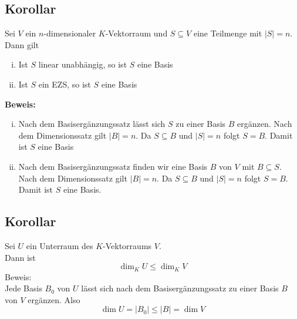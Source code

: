\subsection{Korollar} %
\label{sub:korollar}
Sei $V$ ein $n$-dimensionaler $K$-Vektorraum und $S \subseteq V$ eine Teilmenge mit $|S| =n$. Dann gilt
\begin{enumerate}[(i)]
	\item Ist $S$ linear unabhängig, so ist $S$ eine Basis
	\item Ist $S$ ein EZS, so ist $S$ eine Basis
\end{enumerate}
\textbf{Beweis:} 
\begin{enumerate}[(i)]
	\item Nach dem Basisergänzungssatz lässt sich $S$ zu einer Basis $B$ ergänzen. Nach dem Dimensionssatz gilt $|B|=n$. 
	Da $S \subseteq B$ und $|S|=n$ folgt $S=B$. Damit ist $S$ eine Basis
	\item Nach dem Basisergänzungssatz finden wir eine Basis $B$ von $V$ mit $B \subseteq S$. Nach dem Dimensionssatz gilt
	$|B|=n$. Da $S \subseteq  B$ und $|S|=n$ folgt $S=B$. Damit ist $S$ eine Basis.
\end{enumerate}

\subsection{Korollar} %
\label{sub:korollar}
Sei $U$ ein Unterraum des $K$-Vektorraums $V$. \\
Dann ist 
\[
	\dim_K U \leq \dim_K V
\]
Beweis: \\
Jede Basis $B_0$ von $U$ lässt sich nach dem Basisergänzungssatz zu einer Basis $B$ von $V$ ergänzen. Also 
\[
	\dim U = |B_0| \leq |B| = \dim V
\]

